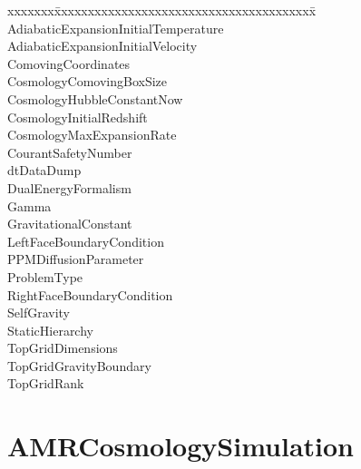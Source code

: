 \documentclass{book}
\begin{document}
{\parametersize
\begin{tabbing}
xxxxxxx\=xxxxxxxxxxxxxxxxxxxxxxxxxxxxxxxxxxxxxxx\=\kill
\> AdiabaticExpansionInitialTemperature   \\
\> AdiabaticExpansionInitialVelocity       \\
\> ComovingCoordinates                \\
\> CosmologyComovingBoxSize        \\
\> CosmologyHubbleConstantNow  \\
\> CosmologyInitialRedshift          \\
\> CosmologyMaxExpansionRate       \\
\> CourantSafetyNumber     \\
\> dtDataDump              \\
\> DualEnergyFormalism           \\
\> Gamma                   \\
\> GravitationalConstant             \\
\> LeftFaceBoundaryCondition          \\
\> PPMDiffusionParameter          \\
\> ProblemType                       \\
\> RightFaceBoundaryCondition  \\
\> SelfGravity                        \\
\> StaticHierarchy                \\
\> TopGridDimensions           \\
\> TopGridGravityBoundary             \\
\> TopGridRank                
\end{tabbing}}

\subsection{\cello}

\section{AMRCosmologySimulation} \label{s:AMRCosmologySimulation}
\end{document}
